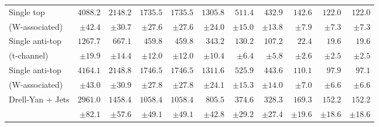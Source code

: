 \begin{landscape}
\begin{table}
\begin{tabular}{l | r r r r r r r r r r }
            Single top  &$            4088.2 $&$            2148.2 $&$            1735.5 $&$            1735.5 $&$            1305.8 $&$             511.4 $&$             432.9 $&$             142.6 $&$             122.0 $&$             122.0 $ \\

            (W-associated)      &$ \pm             42.4 $&$ \pm             30.7 $&$ \pm             27.6 $&$ \pm             27.6 $&$ \pm             24.0 $&$ \pm             15.0 $&$ \pm             13.8 $&$ \pm              7.9 $&$ \pm              7.3 $&$ \pm              7.3 $ \\

          Single anti-top &$            1267.7 $&$             667.1 $&$             459.8 $&$             459.8 $&$             343.2 $&$             130.2 $&$             107.2 $&$              22.4 $&$              19.6 $&$              19.6 $ \\

          (t-channel)        &$ \pm             19.9 $&$ \pm             14.4 $&$ \pm             12.0 $&$ \pm             12.0 $&$ \pm             10.4 $&$ \pm              6.4 $&$ \pm              5.8 $&$ \pm              2.6 $&$ \pm              2.5 $&$ \pm              2.5 $ \\

         Single anti-top &$            4164.1 $&$            2148.8 $&$            1746.5 $&$            1746.5 $&$            1311.6 $&$             525.9 $&$             443.6 $&$             110.1 $&$              97.9 $&$              97.1 $ \\

           (W-associated)     &$ \pm             43.0 $&$ \pm             30.9 $&$ \pm             27.8 $&$ \pm             27.8 $&$ \pm             24.1 $&$ \pm             15.3 $&$ \pm             14.0 $&$ \pm              7.0 $&$ \pm              6.6 $&$ \pm              6.6 $ \\

          Drell-Yan + Jets &$            2961.0 $&$            1458.4 $&$            1058.4 $&$            1058.4 $&$             805.5 $&$             374.6 $&$             328.3 $&$             169.3 $&$             152.2 $&$             152.2 $ \\
          
                  &$ \pm             82.1 $&$ \pm             57.6 $&$ \pm             49.1 $&$ \pm             49.1 $&$ \pm             42.8 $&$ \pm             29.2 $&$ \pm             27.4 $&$ \pm             19.6 $&$ \pm             18.6 $&$ \pm             18.6 $ \\


\end{tabular}
\end{table}
\end{landscape}
